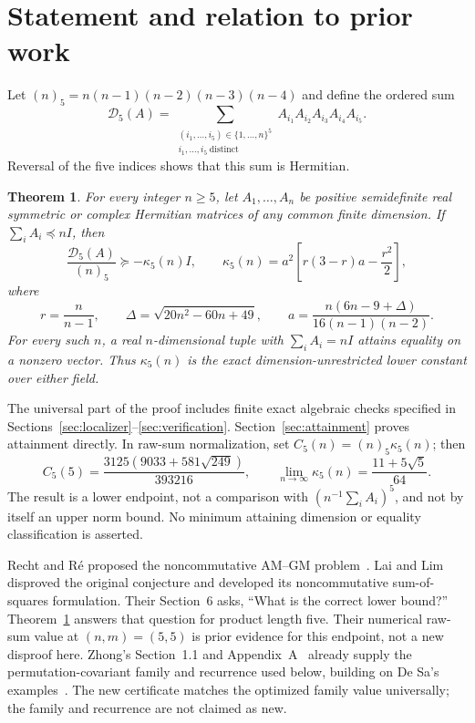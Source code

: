 \documentclass[11pt]{article}
\newtheorem{theorem}{Theorem}
\newcommand{\D}{\mathcal D_5}
\begin{document}
\section{Statement and relation to prior work}\label{sec:statement}
Let $(n)_5=n(n-1)(n-2)(n-3)(n-4)$ and define the ordered sum
\[
 \D(A)=\sum_{\substack{(i_1,\ldots,i_5)\in\{1,\ldots,n\}^5\\
                       i_1,\ldots,i_5\ \mathrm{distinct}}}
 A_{i_1}A_{i_2}A_{i_3}A_{i_4}A_{i_5}.
\]
Reversal of the five indices shows that this sum is Hermitian.
\begin{theorem}\label{thm:main}
For every integer $n\ge5$, let $A_1,\ldots,A_n$ be positive semidefinite
real symmetric or complex Hermitian matrices of any common finite dimension.
If $\sum_iA_i\preceq nI$, then
\begin{equation}\label{eq:main}
 \frac{\D(A)}{(n)_5}\succeq-\kappa_5(n)I,
 \qquad \kappa_5(n)=a^2\left[r(3-r)a-\frac{r^2}{2}\right],
\end{equation}
where
\begin{equation}\label{eq:parameters}
 r=\frac n{n-1},\qquad \Delta=\sqrt{20n^2-60n+49},\qquad
 a=\frac{n(6n-9+\Delta)}{16(n-1)(n-2)}.
\end{equation}
For every such $n$, a real $n$-dimensional tuple with $\sum_iA_i=nI$
attains equality on a nonzero vector. Thus $\kappa_5(n)$ is the exact
dimension-unrestricted lower constant over either field.
\end{theorem}
The universal part of the proof includes finite exact algebraic checks
specified in Sections~\ref{sec:localizer}--\ref{sec:verification}.
Section~\ref{sec:attainment} proves attainment directly. In raw-sum
normalization, set $C_5(n)=(n)_5\kappa_5(n)$; then
\[
 C_5(5)=\frac{3125(9033+581\sqrt{249})}{393216},\qquad
 \lim_{n\to\infty}\kappa_5(n)=\frac{11+5\sqrt5}{64}.
\]
The result is a lower endpoint, not a comparison with
$(n^{-1}\sum_iA_i)^5$, and not by itself an upper norm bound.
No minimum attaining dimension or equality classification is asserted.

Recht and R\'e proposed the noncommutative AM--GM problem~\cite{recht-re}.
Lai and Lim~\cite{lai-lim} disproved the original conjecture and developed
its noncommutative sum-of-squares formulation. Their Section~6 asks,
``What is the correct lower bound?'' Theorem~\ref{thm:main} answers that
question for product length five. Their numerical raw-sum value at
$(n,m)=(5,5)$ is prior evidence for this endpoint, not a new disproof here.
Zhong's Section~1.1 and Appendix~A~\cite{zhong} already supply the
permutation-covariant family and recurrence used below, building on
De Sa's examples~\cite{desa}. The new certificate matches the optimized
family value universally; the family and recurrence are not claimed as new.
\end{document}
